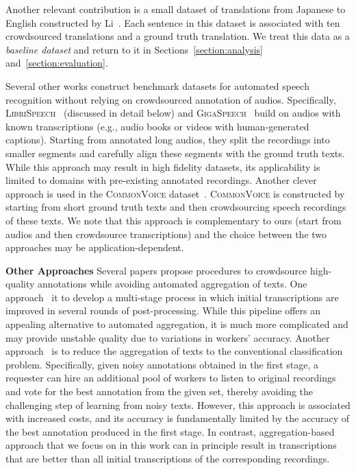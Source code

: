 \documentclass{article}
\newcommand{\libri}{\textsc{LibriSpeech}}
\newcommand{\common}{\textsc{CommonVoice}}
\newcommand{\giga}{\textsc{GigaSpeech}}
\begin{document}
Another relevant contribution is a small dataset of translations from Japanese to English constructed by Li~\citep{li19crowdwsa}. Each sentence in this dataset is associated with ten crowdsourced translations and a ground truth translation. We treat this data as a \emph{baseline dataset} and return to it in Sections~\ref{section:analysis} and~\ref{section:evaluation}.

Several other works construct benchmark datasets for automated speech recognition without relying on crowdsourced annotation of audios. Specifically, \libri{}~\citep{panayotov15librispeech} (discussed in detail below) and \giga{}~\citep{chen2021gigaspeech} build on audios with known transcriptions (e.g., audio books or videos with human-generated captions). Starting from annotated long audios, they split the recordings into smaller segments and carefully align these segments with the ground truth texts. While this approach may result in high fidelity datasets, its applicability is limited to domains with pre-existing annotated recordings. Another clever approach is used in the \common{} dataset~\citep{commonvoice2020}. \common{} is constructed by starting from short ground truth texts and then crowdsourcing speech recordings of these texts. We note that this approach is complementary to ours (start from audios and then crowdsource transcriptions) and the choice between the two approaches may be application-dependent.

\textbf{Other Approaches} Several papers propose procedures to crowdsource high-quality annotations while avoiding automated aggregation of texts. One approach~\citep{lee2011transcription, McGraw2012AutomatingCL} it to develop a multi-stage process in which initial transcriptions are improved in several rounds of
post-processing. While this pipeline offers an appealing alternative to automated aggregation, it is much more complicated and may provide unstable quality due to variations in workers' accuracy. Another approach~\citep{bernstein10soylent} is to reduce the aggregation of texts to the conventional classification problem. Specifically, given noisy annotations obtained in the first stage, a requester can hire an additional pool of workers to listen to original recordings and vote for the best annotation from the given set, thereby avoiding the challenging step of learning from noisy texts. However, this approach is associated with increased costs, and its accuracy is fundamentally limited by the accuracy of the best annotation produced in the first stage. In contrast, aggregation-based approach that we focus on in this work can in principle result in transcriptions that are better than all initial transcriptions of the corresponding recordings.
\end{document}
